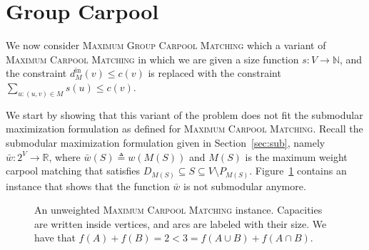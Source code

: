 \documentclass[11pt]{article}
\newcommand{\eqdf}{\triangleq}
\def\R{\mathbb{R}}
\def\N{\mathbb{N}}
\newcommand{\din}[1][M]{d^{\text{in}}_{#1}}
\newcommand{\carpool}{\textsc{Maximum Carpool Matching}\xspace}
\newcommand{\gcp}{\textsc{Maximum Group Carpool Matching}\xspace}
\newcommand{\barw}{\bar{w}}
\begin{document}


\section{Group Carpool}
\label{sec:group}

We now consider \gcp which a variant of \carpool in which
%
we are given a size function $s:V \to \N$, and the constraint
$\din[M](v) \leq c(v)$ is replaced with the constraint
$\sum_{u:(u,v) \in M} s(u) \leq c(v)$.
%

We start by showing that this variant of the problem does not fit the
submodular maximization formulation as defined for \carpool.
%
Recall the submodular maximization formulation given in
Section~\ref{sec:sub}, namely $\barw: 2^V \to \R$, where
$\barw(S) \eqdf w(M(S))$ and $M(S)$ is the maximum weight carpool
matching that satisfies $D_{M(S)} \subseteq S \subseteq V \setminus
P_{M(S)}$.
%
Figure~\ref{fig:not submodular} contains an instance that shows that
the function $\barw$ is not submodular anymore.

\begin{figure}[t]
\begin{center}
\end{center}
\caption{An unweighted \carpool instance.  Capacities are written
  inside vertices, and arcs are labeled with their size.  We have that
  $f(A) + f(B) = 2 < 3 = f(A \cup B) + f(A \cap B)$.}
\label{fig:not submodular}
\end{figure}
\end{document}
